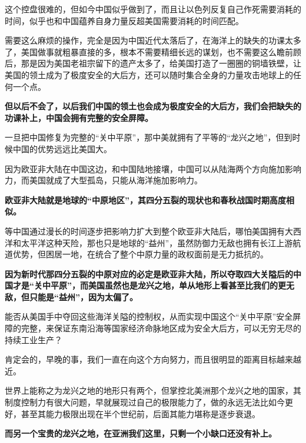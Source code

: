 \documentclass[UTF8, 11pt, oneside]{ctexart}
\newcommand{\zd}[1]{\textbf{\textcolor[RGB]{123,12,0}{#1}}} %
\begin{document}
这个控盘很难的，但如今中国似乎做到了，而且让以色列反复自己作死需要消耗的时间，似乎也和中国蕴养自身力量反超美国需要消耗的时间匹配。

需要这么麻烦的操作，完全是因为中国近代太落后了，在海洋上的缺失的功课太多了，美国做事就粗暴直接的多，根本不需要精细长远的谋划，也不需要这么瞻前顾后，那是因为美国老祖宗留下的遗产太多了，给美国打造了一圈圈的铜墙铁壁，让美国的领土成为了极度安全的大后方，还可以随时集合全身的力量攻击地球上的任何一个点。

\zd{但以后不会了，以后我们中国的领土也会成为极度安全的大后方，我们会把缺失的功课补上，中国会拥有完整的安全屏障。}

一旦把中国修复为完整的“关中平原”，那中美就拥有了平等的“龙兴之地”，但到时候中国的优势远远比美国大。

因为欧亚非大陆在中国这边，和中国陆地接壤，中国可以从陆海两个方向施加影响力，而美国就成了大型孤岛，只能从海洋施加影响力。

\zd{欧亚非大陆就是地球的“中原地区”，其四分五裂的现状也和春秋战国时期高度相似。}

等中国通过漫长的时间逐步把影响力扩大到整个欧亚非大陆后，哪怕美国拥有大西洋和太平洋这种天险，那也只是地球的“益州”，虽然防御力无敌也拥有长江上游航道优势，但困居一地，在统合了整个中原力量的政权面前是无力抵抗的。

\zd{因为新时代那四分五裂的中原对应的必定是欧亚非大陆，所以夺取四大关隘后的中国才是“关中平原”，而美国虽然也是龙兴之地，单从地形上看甚至比我们的更无敌，但只能是“益州”，因为太偏了。}

能否从美国手中夺回这些海洋关隘的控制权，从而实现中国这个“关中平原”安全屏障的完整，来保证东南沿海等国家经济命脉地区成为安全大后方，可以无穷无尽的持续工业生产？

肯定会的，早晚的事，我们一直在向这个方向努力，而且很明显的距离目标越来越近。

世界上能称之为龙兴之地的地形只有两个，但掌控北美洲那个龙兴之地的国家，其制度控制力有很大问题，早就展现过自己的极限能力了，做的永远无法比如今更好，甚至其能力极限出现在半个世纪前，后面其能力堪称是逐步衰退。

\zd{而另一个宝贵的龙兴之地，在亚洲我们这里，只剩一个小缺口还没有补上。}
\end{document}
